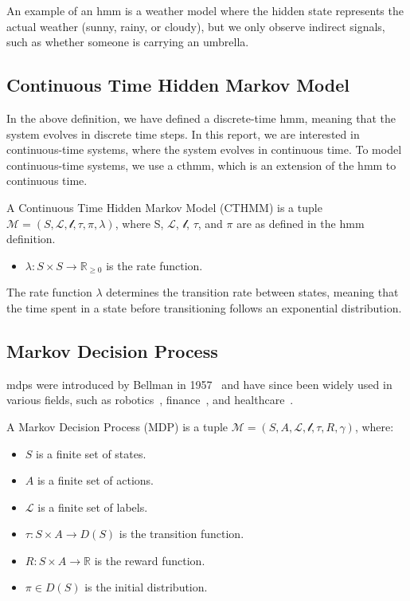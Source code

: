 An example of an \gls{hmm} is a weather model where the hidden state represents the actual weather (sunny, rainy, or cloudy), but we only observe indirect signals, such as whether someone is carrying an umbrella.

\subsection{Continuous Time Hidden Markov Model}\label{subsec:ctmc}
In the above definition, we have defined a discrete-time \gls{hmm}, meaning that the system evolves in discrete time steps.
In this report, we are interested in continuous-time systems, where the system evolves in continuous time.
To model continuous-time systems, we use a \gls{cthmm}, which is an extension of the \gls{hmm} to continuous time.
\begin{definition}
    A Continuous Time Hidden Markov Model (CTHMM) is a tuple $\mathcal{M} = (S, \mathcal{L}, \mathscr{l}, \tau,  \pi, \lambda)$, where S, $\mathcal{L}$, $\mathscr{l}$, $\tau$, and $\pi$ are as defined in the \gls{hmm} definition.
    \begin{itemize}
        \item $\lambda: S \times S \rightarrow \mathbb{R}_{\geq 0}$ is the rate function.
    \end{itemize}
\end{definition}

The rate function $\lambda$ determines the transition rate between states, meaning that the time spent in a state before transitioning follows an exponential distribution.

\subsection{Markov Decision Process}\label{subsec:mdp}
\glspl{mdp} were introduced by Bellman in 1957~\cite{NOTFOUND} and have since been widely used in various fields, such as robotics~\cite{NOTFOUND}, finance~\cite{NOTFOUND}, and healthcare~\cite{NOTFOUND}.
\begin{definition}
    A Markov Decision Process (MDP) is a tuple $\mathcal{M} = (S, A, \mathcal{L}, \mathscr{l}, \tau, R, \gamma)$, where:
    \begin{itemize}
        \item $S$ is a finite set of states.
        \item $A$ is a finite set of actions.
        \item $\mathcal{L}$ is a finite set of labels.
        \item $\tau: S \times A \rightarrow D(S)$ is the transition function.
        \item $R: S \times A \rightarrow \mathbb{R}$ is the reward function.
        \item $\pi \in D(S)$ is the initial distribution.
    \end{itemize}
\end{definition}

